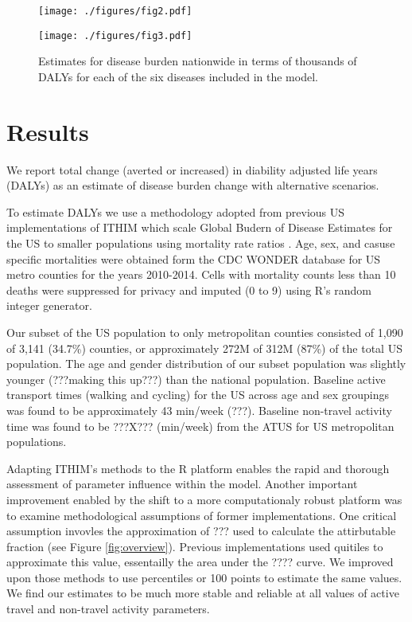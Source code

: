 \documentclass[10pt,letterpaper]{article}\usepackage[]{graphicx}\usepackage[]{color}
\begin{document}
\begin{figure}[t]
  \centerline{\texttt{[image: ./figures/fig2.pdf]}}
    \caption{}\label{fig2}
\end{figure}

\begin{sidewaysfigure}[t]
  \centerline{\texttt{[image: ./figures/fig3.pdf]}}
  \caption{Estimates for disease burden nationwide in terms of thousands of
    DALYs for each of the six diseases included in the model.
  }\label{fig3}
\end{sidewaysfigure}



%

\section*{Results}


We report total change (averted or increased) in diability adjusted
life years (DALYs) as an estimate of disease burden change with
alternative scenarios.

To estimate DALYs we use a methodology adopted from previous US
implementations of ITHIM which scale Global Budern of Disease
Estimates for the US to smaller populations using mortality rate
ratios \cite{maizlish2013}. Age, sex, and casuse specific mortalities
were obtained form the CDC WONDER database for US metro counties for
the years 2010-2014. Cells with mortality counts less than 10 deaths
were suppressed for privacy and imputed (0 to 9) using R's random
integer generator.

Our subset of the US population to only metropolitan counties
consisted of 1,090 of 3,141 (34.7\%) counties, or approximately 272M
of 312M (87\%) of the total US population. The age and gender
distribution of our subset population was slightly younger (???making
this up???) than the national population. Baseline active transport
times (walking and cycling) for the US across age and sex groupings
was found to be approximately 43 min/week (???). Baseline non-travel
activity time was found to be ???X??? (min/week) from the ATUS for US
metropolitan populations.

Adapting ITHIM's methods to the R platform enables the rapid and
thorough assessment of parameter influence within the model. Another
important improvement enabled by the shift to a more computationaly
robust platform was to examine methodological assumptions of former
implementations. One critical assumption invovles the approximation of
??? used to calculate the attirbutable fraction (see Figure
\ref{fig:overview}). Previous implementations used quitiles to
approximate this value, essentailly the area under the ???? curve. We
improved upon those methods to use percentiles or 100 points to
estimate the same values. We find our estimates to be much more stable
and reliable at all values of active travel and non-travel activity
parameters.
\end{document}
